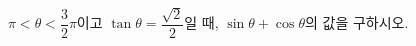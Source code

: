 $\pi<\theta<\dfrac{3}{2}\pi$이고 $\tan\theta=\dfrac{\sqrt{2}}{2}$일 때, $\sin\theta+\cos\theta$의 값을 구하시오.
